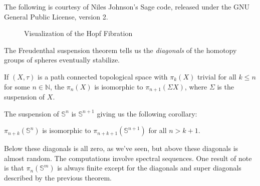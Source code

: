 \documentclass{beamer}
\begin{document}
    \begin{frame}
        The following is courtesy of Niles Johnson's Sage code, released under
        the GNU General Public License, version 2.
        \begin{figure}
            \caption{Visualization of the Hopf Fibration}
            \label{fig:hopf_fibration}
        \end{figure}
    \end{frame}
    \begin{frame}
        The Freudenthal suspension theorem tells us the \textit{diagonals} of
        the homotopy groups of spheres eventually stabilize.
        \begin{theorem}
            If $(X,\tau)$ is a path connected topological space with
            $\pi_{k}(X)$ trivial for all $k\leq{n}$ for some $n\in\mathbb{N}$,
            the $\pi_{n}(X)$ is isomorphic to
            $\pi_{n+1}(\Sigma{X})$, where $\Sigma$ is the suspension of $X$.
        \end{theorem}
        The suspension of $\mathbb{S}^{n}$ is $\mathbb{S}^{n+1}$ giving us the
        following corollary:
        \begin{theorem}
            $\pi_{n+k}(\mathbb{S}^{n})$ is isomorphic to
            $\pi_{n+k+1}(\mathbb{S}^{n+1})$ for all $n>k+1$.
        \end{theorem}
        Below these diagonals is all zero, as we've seen, but above these
        diagonals is almost random. The computations involve spectral sequences.
        One result of note is that $\pi_{n}(\mathbb{S}^{m})$ is always finite
        except for the diagonals and super diagonals described by the
        previous theorem.
    \end{frame}
\end{document}
